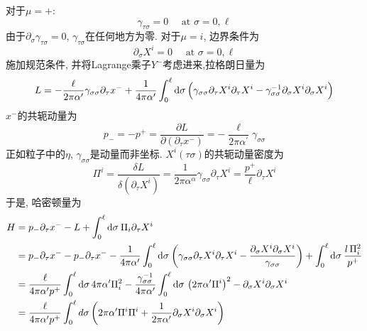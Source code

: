 \noindent 对于$\mu=+$:
\begin{equation}
\gamma_{\tau \sigma}=0 \quad \text { at } \sigma=0, \ell
\end{equation}
由于$\partial_\sigma\gamma_{\tau\sigma}=0$, $\gamma_{\tau\sigma}$在任何地方为零. 
对于$\mu=i$, 边界条件为
\begin{equation}
\partial_{\sigma} X^{i}=0 \quad \text { at } \sigma=0, \ell   \label{bound-mu-i}
\end{equation}
施加规范条件, 并将Lagrange乘子$Y^-$考虑进来,拉格朗日量为
\begin{equation}
L=-\frac{\ell}{2 \pi \alpha^{\prime}} \gamma_{\sigma \sigma} \partial_{\tau} x^{-}+\frac{1}{4 \pi \alpha^{\prime}} \int_{0}^{\ell} \mathrm{d}\sigma\,\Bigl(\gamma_{\sigma \sigma} \partial_{\tau} X^{i} \partial_{\tau} X^{i}-\gamma_{\sigma \sigma}^{-1} \partial_{\sigma} X^{i} \partial_{\sigma} X^{i}\Bigr)
\end{equation}
$x^-$的共轭动量为
\begin{equation}
p_{-}=-p^{+}=\frac{\partial L}{\partial\left(\partial_{\tau} x^{-}\right)}=-\frac{\ell}{2 \pi \alpha^{\prime}} \gamma_{\sigma \sigma}
\end{equation}
正如粒子中的$\eta$, $\gamma_{\sigma\sigma}$是动量而非坐标. $X^i(\tau\sigma)$的共轭动量密度为
\begin{equation}
\Pi^{i}=\frac{\delta L}{\delta\left(\partial_{\tau} X^{i}\right)}=\frac{1}{2 \pi \alpha^{\alpha}} \gamma_{\sigma \sigma} \partial_{\tau} X^{i}=\frac{p^{+}}{\ell} \partial_{\tau} X^{i} \label{1.3.18}
\end{equation}
于是, 哈密顿量为
\begin{align}
H &=p_{-} \partial_{\tau} x^{-}-L+\int_{0}^{\ell} \mathrm{d} \sigma\: \Pi_{i} \partial_{\tau} X^{i} \nonumber \\
&= p_{-} \partial_{\tau}  x^{-}-p_{-} \partial_{\tau} x^{-} -\frac{1}{4 \pi \alpha^{\prime}} \int_{0}^{\ell} \mathrm{d} \sigma\:\biggl(\gamma_{\sigma \sigma} \partial_{\tau} X^{i} \partial_{\tau} X^{i}-\frac{\partial_{\sigma} X^{i} \partial_{\sigma} X^{i}}{\gamma_{\sigma \sigma}}\biggr) 
+\int_{0}^{\ell} \mathrm{d} \sigma\: \frac{l\,\Pi_{i}^{2} }{ p^{+}} \nonumber \\
&=\frac{\ell}{4 \pi \alpha^{\prime} p^{+}} \int_{0}^{\ell} \mathrm{d} \sigma\, 4 \pi \alpha^{\prime}\Pi_{i}^{2} -\frac{\gamma_{\sigma\sigma}^{-1}}{4 \pi \alpha^{\prime}} \int_{0}^{\ell} \mathrm{d} \sigma\,\left(2 \pi \alpha^{\prime} \Pi^{i}\right)^{2}-\partial_\sigma X^{i} \partial _\sigma X^{i} \nonumber \\
&=\frac{\ell}{4 \pi \alpha^{\prime} p^{+}} \int_{0}^{\ell} d \sigma\left(2 \pi \alpha^{\prime} \Pi^{i} \Pi^{i}+\frac{1}{2 \pi \alpha^{\prime}} \partial_{\sigma} X^{i} \partial_{\sigma} X^{i}\right) \label{1.3.19}
\end{align}
